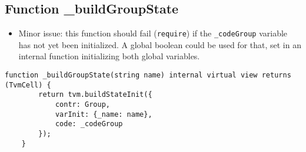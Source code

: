 \subsection{Function \_{}buildGroupState}

\begin{itemize}
\item Minor issue: this function should fail ({\tt require}) if the
  {\tt \_codeGroup} variable has not yet been initialized. A global
  boolean could be used for that, set in an internal function
  initializing both global variables.
\end{itemize}

\begin{lstlisting}[firstnumber=16]
    function _buildGroupState(string name) internal virtual view returns (TvmCell) {
        return tvm.buildStateInit({
            contr: Group,
            varInit: {_name: name},
            code: _codeGroup
        });
    }
\end{lstlisting}
